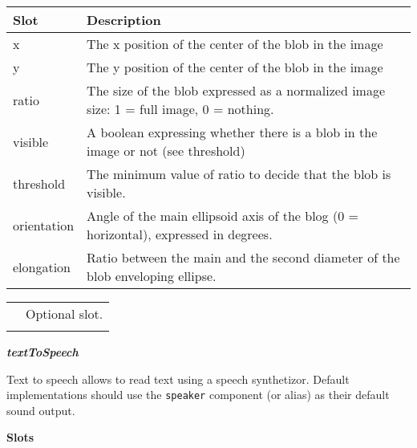 \documentclass[a4paper]{article}
\begin{document}
\begin{flushleft}
\tablehead{}
\begin{supertabular}{|m{3.293cm}|m{11.997cm}|}
\hline
{}\sffamily\bfseries Slot &
\sffamily\bfseries Description\\\hline
{} x &
\sffamily The x position of the center of the
blob in the image\\\hline
{} y &
\sffamily The y position of the center of the
blob in the image\\\hline
{} ratio &
\sffamily The size of the blob expressed as a
normalized image size: 1 = full image, 0 = nothing.\\\hline
{} visible &
 \textsf{A boolean expressing whether there is a
blob in the image or not (see }threshold\textsf{)}\\\hline
{} threshold &
 \textsf{The minimum value of }ratio\textsf{ to
decide that the blob is }visible\textsf{.}\\\hline
{} orientation &
\sffamily Angle of the main ellipsoid axis of
the blog (0 = horizontal), expressed in degrees.\\\hline
{} elongation &
\sffamily Ratio between the main and the second
diameter of the blob enveloping ellipse.\\\hline
\end{supertabular}
\end{flushleft}
\begin{flushleft}
\tablehead{}
\begin{supertabular}{|m{1.717cm}|m{10.464cm}}
\hhline{-~}
 &
\sffamily Optional slot.\\\hhline{-~}
\end{supertabular}
\end{flushleft}
{\sffamily\bfseries\itshape
textToSpeech}

{\sffamily
Text to speech allows to read text using a speech synthetizor. Default
implementations should use the \texttt{speaker} component (or alias) as
their default sound output.}

{\sffamily\bfseries
Slots}
\end{document}

